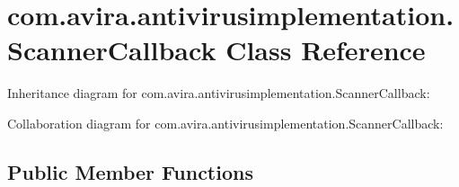 \hypertarget{classcom_1_1avira_1_1antivirusimplementation_1_1_scanner_callback}{}\section{com.\+avira.\+antivirusimplementation.\+Scanner\+Callback Class Reference}
\label{classcom_1_1avira_1_1antivirusimplementation_1_1_scanner_callback}


Inheritance diagram for com.\+avira.\+antivirusimplementation.\+Scanner\+Callback\+:


Collaboration diagram for com.\+avira.\+antivirusimplementation.\+Scanner\+Callback\+:
\subsection*{Public Member Functions}
